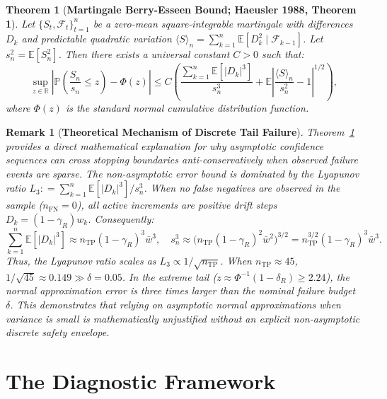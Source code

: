 \documentclass[11pt,a4paper]{article}
\newcommand{\coloneqq}{\mathrel{\mathop:}=}
\newtheorem{theorem}{Theorem}
\newtheorem{remark}{Remark}
\begin{document}
\begin{theorem}[\textbf{Martingale Berry-Esseen Bound; Haeusler 1988, Theorem 1}]\label{thm:berry_esseen}
Let $\{S_t, \mathcal{F}_t\}_{t=1}^n$ be a zero-mean square-integrable martingale with differences $D_k$ and predictable quadratic variation $\langle S \rangle_n = \sum_{k=1}^n \mathbb{E}[D_k^2 \mid \mathcal{F}_{k-1}]$. Let $s_n^2 = \mathbb{E}[S_n^2]$. Then there exists a universal constant $C > 0$ such that:
\begin{equation}\label{eq:berry_esseen_rate}
\sup_{z \in \mathbb{R}} \left| \mathbb{P}\left(\frac{S_n}{s_n} \le z\right) - \Phi(z) \right| \le C \left( \frac{\sum_{k=1}^n \mathbb{E}[|D_k|^3]}{s_n^3} + \mathbb{E}\left|\frac{\langle S \rangle_n}{s_n^2} - 1\right|^{1/2} \right),
\end{equation}
where $\Phi(z)$ is the standard normal cumulative distribution function.
\end{theorem}

\begin{remark}[\textbf{Theoretical Mechanism of Discrete Tail Failure}]\label{rem:berry_esseen_implication}
Theorem~\ref{thm:berry_esseen} provides a direct mathematical explanation for why asymptotic confidence sequences can cross stopping boundaries anti-conservatively when observed failure events are sparse.
The non-asymptotic error bound is dominated by the Lyapunov ratio $L_3 \coloneqq \sum_{k=1}^n \mathbb{E}[|D_k|^3] / s_n^3$.
When no false negatives are observed in the sample ($n_{\text{FN}} = 0$), all active increments are positive drift steps $D_k = (1 - \gamma_R) w_k$. Consequently:
\begin{equation}
\sum_{k=1}^n \mathbb{E}[|D_k|^3] \approx n_{\text{TP}} (1 - \gamma_R)^3 \bar{w}^3, \quad s_n^3 \approx \big(n_{\text{TP}} (1 - \gamma_R)^2 \bar{w}^2\big)^{3/2} = n_{\text{TP}}^{3/2} (1 - \gamma_R)^3 \bar{w}^3.
\end{equation}
Thus, the Lyapunov ratio scales as $L_3 \propto 1 / \sqrt{n_{\text{TP}}}$. 
When $n_{\text{TP}} \approx 45$, $1 / \sqrt{45} \approx 0.149 \gg \delta = 0.05$.
In the extreme tail ($z \approx \Phi^{-1}(1 - \delta_R) \ge 2.24$), the normal approximation error is \emph{three times larger than the nominal failure budget $\delta$}. This demonstrates that relying on asymptotic normal approximations when variance is small is mathematically unjustified without an explicit non-asymptotic discrete safety envelope.
\end{remark}

\newpage
\section{The Diagnostic Framework}
\end{document}
